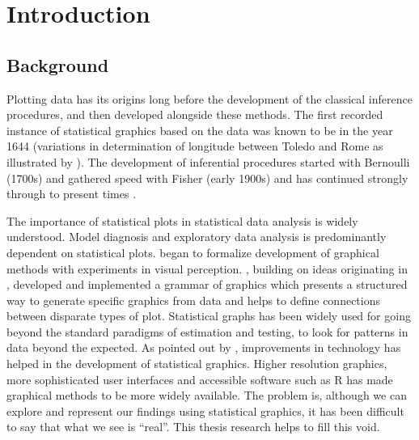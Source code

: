 \chapter{Introduction}\label{ch:introduction}


\section{Background}

Plotting data has its origins long before the development of the classical inference procedures, and then developed alongside these methods. The first recorded instance of statistical graphics based on the data was known to be in the year 1644 (variations in determination of longitude between Toledo and Rome as illustrated by \cite{friendly:2001}). The development of inferential procedures started with Bernoulli (1700s) and gathered speed with Fisher (early 1900s) and has continued strongly through to present times \citep{hald:2004}. 

The importance of statistical plots in statistical data analysis is widely understood. Model diagnosis and exploratory data analysis is predominantly dependent on statistical plots. \cite{cleveland:1984} began to formalize development of graphical methods with experiments in visual perception. \cite{hadley:2009}, building on ideas originating in \cite{wilkinson:1999}, developed and implemented a grammar of graphics which presents a structured way to generate specific graphics from data and helps to define connections between disparate types of plot. Statistical graphs has been widely used for going beyond the standard paradigms of estimation and testing, to look for patterns in data beyond the expected. As pointed out by \cite{gelman:2004}, improvements in technology has helped in the development of statistical graphics. Higher resolution graphics, more sophisticated user interfaces and accessible software such as R \citep{r} has made graphical methods to be more widely available.  The problem is, although we can explore and represent our findings using statistical graphics, it has been difficult to say that what we see is ``real''. This thesis research helps to fill this void.


